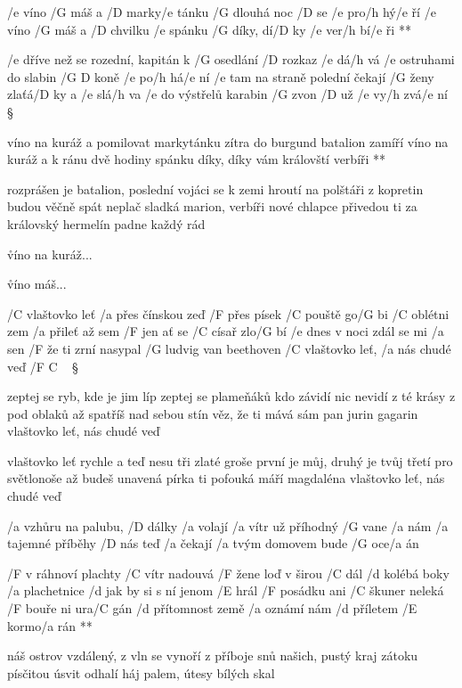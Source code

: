 \R  /e víno /G máš a /D marky/e tánku
    /G dlouhá noc /D se /e pro/h hý/e ří
   /e víno /G máš a /D chvilku /e spánku
    /G díky, dí/D ky /e ver/h bí/e ři **

/e dříve než se rozední, kapitán k /G osedlání /D rozkaz /e dá/h vá
/e ostruhami do slabin /{G D} koně /e po/h há/e ní
/e tam na straně polední čekají /G ženy zlaťá/D ky a /e slá/h va
/e do výstřelů karabin /G zvon /D už /e vy/h zvá/e ní \S

\R víno na kuráž a pomilovat markytánku
   zítra do burgund batalion zamíří
   víno na kuráž a k ránu dvě hodiny spánku
   díky, díky vám královští verbíři **

rozprášen je batalion, poslední vojáci se k zemi hroutí
na polštáři z kopretin budou věčně spát
neplač sladká marion, verbíři nové chlapce přivedou ti
za královský hermelín padne každý rád \s

\r víno na kuráž...

\r víno máš...




/C vlaštovko leť /a přes čínskou zeď
/F přes písek /C pouště go/G bi
/C oblétni zem /a přileť až sem
/F jen ať se /C císař zlo/G bí
/e dnes v noci zdál se mi /a sen
/F že ti zrní nasypal /G ludvig van beethoven
/C vlaštovko leť, /a nás chudé veď /{F C} {\ } \S

zeptej se ryb, kde je jim líp
zeptej se plameňáků
kdo závidí nic nevidí
z té krásy z pod oblaků
až spatříš nad sebou stín
věz, že ti mává sám pan jurin gagarin
vlaštovko leť, nás chudé veď \s

vlaštovko leť rychle a teď
nesu tři zlaté groše
první je můj, druhý je tvůj
třetí pro světlonoše
až budeš unavená
pírka ti pofouká máří magdaléna
vlaštovko leť, nás chudé veď \s




/a vzhůru na palubu, /D dálky /a volají
/a vítr už příhodný /G vane /a nám
/a tajemné příběhy /D nás teď /a čekají
/a tvým domovem bude /G oce/a án

\R  /F v ráhnoví plachty /C vítr nadouvá
    /F žene loď v širou /C dál
    /d kolébá boky /a plachetnice
    /d jak by si s ní jenom /E hrál
    /F posádku ani /C škuner neleká
    /F bouře ni ura/C gán
    /d přítomnost země /a oznámí nám
    /d příletem /E kormo/a rán **

náš ostrov vzdálený, z vln se vynoří
z příboje snů našich, pustý kraj
zátoku písčitou úsvit odhalí
háj palem, útesy bílých skal

